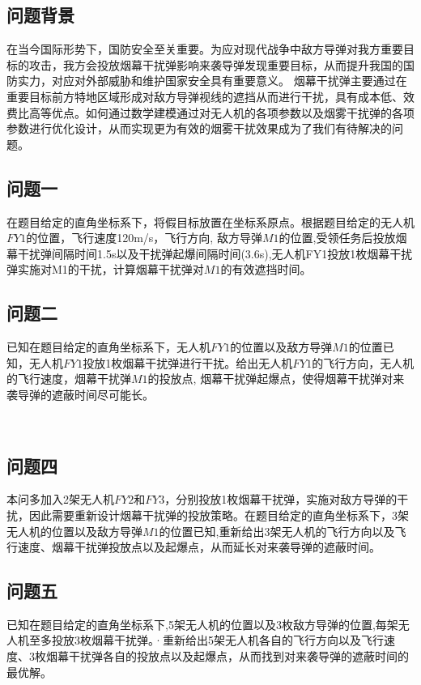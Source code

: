 \documentclass[../main.tex]{subfiles}
\begin{document}
\subsection{问题背景}
\par 在当今国际形势下，国防安全至关重要。为应对现代战争中敌方导弹对我方重要目标的攻击，我方会投放烟幕干扰弹影响来袭导弹发现重要目标，从而提升我国的国防实力，对应对外部威胁和维护国家安全具有重要意义。 烟幕干扰弹主要通过在重要目标前方特地区域形成对敌方导弹视线的遮挡从而进行干扰，具有成本低、效费比高等优点。如何通过数学建模通过对无人机的各项参数以及烟雾干扰弹的各项参数进行优化设计，从而实现更为有效的烟雾干扰效果成为了我们有待解决的问题。



\subsection{问题一}
\par 在题目给定的直角坐标系下，将假目标放置在坐标系原点。根据题目给定的无人机$FY1$的位置，飞行速度120m/s，飞行方向, 敌方导弹$M1$的位置,受领任务后投放烟幕干扰弹间隔时间1.5s以及干扰弹起爆间隔时间(3.6s),无人机FY1投放1枚烟幕干扰弹实施对M1的干扰，计算烟幕干扰弹对$M1$的有效遮挡时间。



\subsection{问题二}
\par 已知在题目给定的直角坐标系下，无人机$FY1$的位置以及敌方导弹$M1$的位置已知，无人机$FY1$投放1枚烟幕干扰弹进行干扰。给出无人机$FY1$的飞行方向，无人机的飞行速度，烟幕干扰弹$M1$的投放点, 烟幕干扰弹起爆点，使得烟幕干扰弹对来袭导弹的遮蔽时间尽可能长。



\
\subsection{问题四}

\par 本问多加入2架无人机$FY2$和$FY3$，分别投放1枚烟幕干扰弹，实施对敌方导弹的干扰，因此需要重新设计烟幕干扰弹的投放策略。在题目给定的直角坐标系下，3架无人机的位置以及敌方导弹$M1$的位置已知,重新给出3架无人机的飞行方向以及飞行速度、烟幕干扰弹投放点以及起爆点，从而延长对来袭导弹的遮蔽时间。



\subsection{问题五}
\par 已知在题目给定的直角坐标系下,5架无人机的位置以及3枚敌方导弹的位置,每架无人机至多投放3枚烟幕干扰弹。·重新给出5架无人机各自的飞行方向以及飞行速度、3枚烟幕干扰弹各自的投放点以及起爆点，从而找到对来袭导弹的遮蔽时间的最优解。
\end{document}
